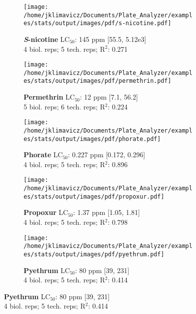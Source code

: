 \documentclass{article}
\begin{document}
\begin{figure}[thp!]
   \begin{subfigure}{0.500\textwidth}
      \centering
      \texttt{[image: /home/jklimavicz/Documents/Plate\_Analyzer/examples/stats/output/images/pdf/s-nicotine.pdf]}
      \vspace{-0.05cm}
      \caption*{\textbf{\textit{S}-nicotine} LC$_{50}$: 145 ppm [55.5, 5.12e3] \\ 
4 biol. reps; 5 tech. reps; R$^2$: 0.271}
      \vspace{0.1cm}
   \end{subfigure}%
   \begin{subfigure}{0.500\textwidth}
      \centering
      \texttt{[image: /home/jklimavicz/Documents/Plate\_Analyzer/examples/stats/output/images/pdf/permethrin.pdf]}
      \vspace{-0.05cm}
      \caption*{\textbf{Permethrin} LC$_{50}$: 12 ppm [7.1, 56.2] \\ 
5 biol. reps; 6 tech. reps; R$^2$: 0.224}
      \vspace{0.1cm}
   \end{subfigure}%
\vspace{-0.1cm}
   \begin{subfigure}{0.500\textwidth}
      \centering
      \texttt{[image: /home/jklimavicz/Documents/Plate\_Analyzer/examples/stats/output/images/pdf/phorate.pdf]}
      \vspace{-0.05cm}
      \caption*{\textbf{Phorate} LC$_{50}$: 0.227 ppm [0.172, 0.296] \\ 
4 biol. reps; 5 tech. reps; R$^2$: 0.896}
      \vspace{0.1cm}
   \end{subfigure}%
   \begin{subfigure}{0.500\textwidth}
      \centering
      \texttt{[image: /home/jklimavicz/Documents/Plate\_Analyzer/examples/stats/output/images/pdf/propoxur.pdf]}
      \vspace{-0.05cm}
      \caption*{\textbf{Propoxur} LC$_{50}$: 1.37 ppm [1.05, 1.81] \\ 
4 biol. reps; 5 tech. reps; R$^2$: 0.798}
      \vspace{0.1cm}
   \end{subfigure}%
\vspace{-0.1cm}
   \begin{subfigure}{0.500\textwidth}
      \centering
      \texttt{[image: /home/jklimavicz/Documents/Plate\_Analyzer/examples/stats/output/images/pdf/pyethrum.pdf]}
      \vspace{-0.05cm}
      \caption*{\textbf{Pyethrum} LC$_{50}$: 80 ppm [39, 231] \\ 
4 biol. reps; 5 tech. reps; R$^2$: 0.414}
      \vspace{0.1cm}
   \end{subfigure}%
\end{figure}
\pagebreak
\end{document}
